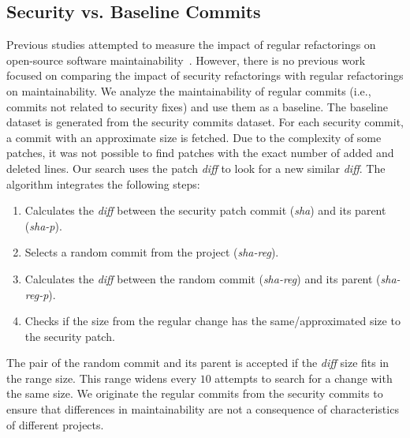 \documentclass[10pt,conference]{IEEEtran}
\begin{document}
%
\subsection{Security vs. Baseline Commits}
%
Previous studies attempted to measure the impact of regular refactorings on
open-source software maintainability~\cite{HEGEDUS2018313}. However, there is no
previous work focused on comparing the impact of security refactorings with
regular refactorings on maintainability.
We analyze the maintainability of regular commits (i.e., commits not related
to security fixes) and use them as a baseline.
The baseline dataset is generated from the security commits dataset.
For each
security commit, a commit with an approximate size is fetched. Due to the complexity 
of some patches, it was not possible to find patches with the exact number of added and 
deleted lines. Our search uses the patch \emph{diff} to look for a new similar \emph{diff}. 
The algorithm integrates the following steps:

\begin{enumerate}
\item Calculates the \emph{diff} between the security patch commit (\emph{sha}) and its parent (\emph{sha-p}).
\item Selects a random commit from the project (\emph{sha-reg}).
\item Calculates the \emph{diff} between the random commit (\emph{sha-reg}) and its parent (\emph{sha-reg-p}).
\item Checks if the size from the regular change has the same/approximated size to 
the security patch.
\end{enumerate}

The pair of the random commit and its parent is accepted if the \emph{diff} 
size fits in the range size. This range widens every $10$ attempts to
search for a change with the same size. We originate the regular commits from the 
security commits to ensure that differences in maintainability are not a 
consequence of characteristics of different projects.
\end{document}
